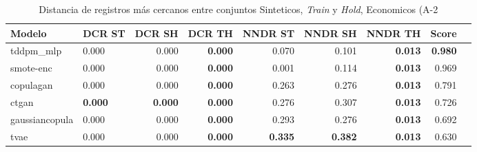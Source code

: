\begin{table}[H]
\centering
\caption{Distancia de registros más cercanos entre conjuntos Sinteticos, \emph{Train} y \emph{Hold}, Economicos (A-2}
\label{table-dcr-economicos-a-2}
\begin{tabular}{|l|l|r|r|r|r|r|r|r|}
\hline
\rowcolor[gray]{0.8}
Modelo & DCR ST & DCR SH & DCR TH & NNDR ST & NNDR SH & NNDR TH & \textbf{Score} \\
\hline tddpm\_mlp & 0.000 & \cellcolor[rgb]{0.9, 0.54, 0.52} 0.000 & \bfseries 0.000 & 0.070 & 0.101 & \bfseries 0.013 & \bfseries 0.980 \\
\hline smote-enc & \cellcolor[rgb]{0.9, 0.54, 0.52} 0.000 & 0.000 & \bfseries 0.000 & 0.001 & 0.114 & \bfseries 0.013 & 0.969 \\
\hline copulagan & 0.000 & 0.000 & \bfseries 0.000 & 0.263 & 0.276 & \bfseries 0.013 & 0.791 \\
\hline ctgan & \bfseries 0.000 & \bfseries 0.000 & \bfseries 0.000 & 0.276 & 0.307 & \bfseries 0.013 & 0.726 \\
\hline gaussiancopula & 0.000 & 0.000 & \bfseries 0.000 & 0.293 & 0.276 & \bfseries 0.013 & 0.692 \\
\hline tvae & 0.000 & 0.000 & \bfseries 0.000 & \bfseries 0.335 & \bfseries 0.382 & \bfseries 0.013 & 0.630 \\
\hline
\end{tabular}
\end{table}
